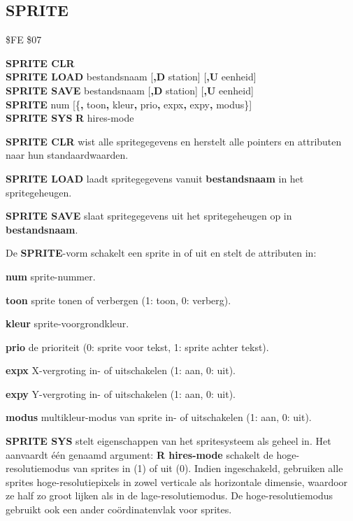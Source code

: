 \subsection{SPRITE}
\begin{description}[leftmargin=2cm,style=nextline]
\item [Token:]    \$FE \$07

\item [Formaat:]   {\bf SPRITE CLR} \\              {\bf SPRITE LOAD} bestandsnaam [{\bf,D} station] [{\bf,U} eenheid] \\                  {\bf SPRITE SAVE} bestandsnaam [{\bf,D} station] [{\bf,U} eenheid] \\                  {\bf SPRITE} num [\{{\bf,} toon{\bf,} kleur{\bf,} prio{\bf,} expx{\bf,} expy{\bf,} modus\}] \\                  {\bf SPRITE SYS} {\bf R} hires-mode \\

\item [Gebruik:]    {\bf SPRITE CLR} wist alle spritegegevens en herstelt alle pointers en attributen naar hun standaardwaarden.

{\bf SPRITE LOAD } laadt spritegegevens vanuit {\bf bestandsnaam} in het spritegeheugen.

{\bf SPRITE SAVE } slaat spritegegevens uit het spritegeheugen op in {\bf bestandsnaam}.

                  \filenamedefinition

                  De {\bf SPRITE}-vorm schakelt een sprite in of uit en stelt de attributen in:

                  {\bf num} sprite-nummer.

                  {\bf toon} sprite tonen of verbergen (1: toon, 0: verberg).

                  {\bf kleur} sprite-voorgrondkleur.

                  {\bf prio} de prioriteit (0: sprite voor tekst, 1: sprite achter tekst).

                  {\bf expx} X-vergroting in- of uitschakelen (1: aan, 0: uit).

                  {\bf expy} Y-vergroting in- of uitschakelen (1: aan, 0: uit).

                  {\bf modus} multikleur-modus van sprite in- of uitschakelen (1: aan, 0: uit).

                  {\bf SPRITE SYS} stelt eigenschappen van het spritesysteem als geheel in. Het aanvaardt één genaamd argument: {\bf R hires-mode} schakelt de hoge-resolutiemodus van sprites in (1) of uit (0). Indien ingeschakeld, gebruiken alle sprites hoge-resolutiepixels in zowel verticale als horizontale dimensie, waardoor ze half zo groot lijken als in de lage-resolutiemodus. De hoge-resolutiemodus gebruikt ook een ander coördinatenvlak voor sprites.


\end{description}
